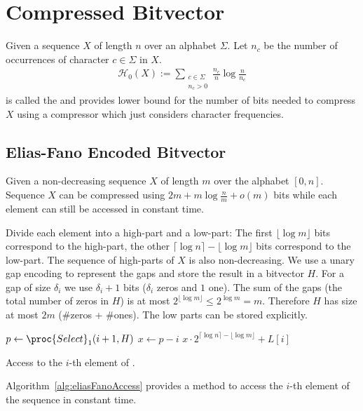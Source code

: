 \section{Compressed Bitvector}

\begin{Definition}
  \label{def:zerothOrderEntropy}
  Given a sequence $X$ of length $n$ over an alphabet $\Sigma$. Let $n_c$ be the number of occurrences of character $c \in \Sigma$ in $X$.
  \begin{align}
    \mathcal{H}_0(X) := \sum\limits_{\substack{c \in \Sigma\\ n_c > 0}} \frac{n_c}{n}\log\frac{n}{n_c}
  \end{align}
  is called the  and provides lower bound for the number of bits needed to compress $X$ using a compressor which just considers character frequencies.
\end{Definition}

\subsection{Elias-Fano Encoded Bitvector}

\begin{Theorem}
  \label{thm:eliasFanoEncoding}
  Given a non-decreasing sequence $X$ of length $m$ over the alphabet $[0,n]$. Sequence $X$ can be compressed using $2m + m\log\frac{n}{m} + o(m)$ bits while each element can still be accessed in constant time.
\end{Theorem}

\begin{Proof}
  Divide each element into a high-part and a low-part: The first $\lfloor \log m \rfloor$ bits correspond to the high-part, the other $\lceil \log n \rceil - \lfloor \log m \rfloor$ bits correspond to the low-part. The sequence of high-parts of $X$ is also non-decreasing. We use a unary gap encoding to represent the gaps and store the result in a bitvector $H$. For a gap of size $\delta_i$ we use $\delta_i + 1$ bits ($\delta_i$ zeros and $1$ one). The sum of the gaps (the total number of zeros in $H$) is at most $2^{\lfloor \log m \rfloor} \leq 2^{\log m} = m$. Therefore $H$ has size at most $2m$ (\#zeros + \#ones). The low parts can be stored explicitly.

  \begin{algorithm}[htbp]
    \begin{codebox}
      \li $p \gets \proc{Select}_1(i + 1, H)$
      \li $x \gets p - i$
      \li \Return  $x \cdot 2^{\lceil\log n\rceil - \lfloor\log m\rfloor} + L[i]$
    \end{codebox}
    \caption{Access to the $i$-th element of .}
    \label{alg:eliasFanoAccess}
  \end{algorithm}

  Algorithm~\ref{alg:eliasFanoAccess} provides a method to access the $i$-th element of the sequence in constant time.
\end{Proof}

